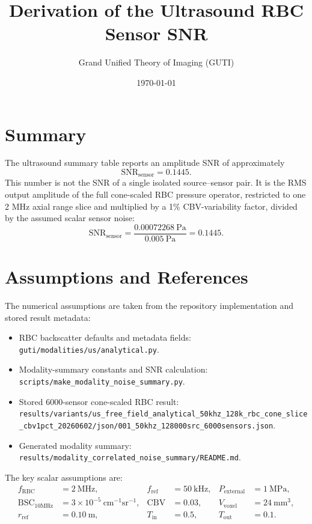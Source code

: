 \documentclass[11pt]{article}
\title{Derivation of the Ultrasound RBC Sensor SNR}
\author{Grand Unified Theory of Imaging (GUTI)}
\date{\today}
\begin{document}
\maketitle

\section*{Summary}

The ultrasound summary table reports an amplitude SNR of approximately
\[
  \mathrm{SNR}_{\mathrm{sensor}} = 0.1445.
\]
This number is not the SNR of a single isolated source--sensor pair.  It is the
RMS output amplitude of the full cone-scaled RBC pressure operator, restricted
to one 2 MHz axial range slice and multiplied by a 1\% CBV-variability factor,
divided by the assumed scalar sensor noise:
\[
  \mathrm{SNR}_{\mathrm{sensor}}
  =
  \frac{0.00072268~\mathrm{Pa}}{0.005~\mathrm{Pa}}
  =
  0.1445.
\]

\section*{Assumptions and References}

The numerical assumptions are taken from the repository implementation and
stored result metadata:
\begin{itemize}
  \item RBC backscatter defaults and metadata fields:
    \texttt{guti/modalities/us/analytical.py}.
  \item Modality-summary constants and SNR calculation:
    \texttt{scripts/make\_modality\_noise\_summary.py}.
  \item Stored 6000-sensor cone-scaled RBC result:
    \texttt{results/variants/us\_free\_field\_analytical\_50khz\_128k\_rbc\_cone\_slice\_cbv1pct\_20260602/json/001\_50khz\_128000src\_6000sensors.json}.
  \item Generated modality summary:
    \texttt{results/modality\_correlated\_noise\_summary/README.md}.
\end{itemize}

The key scalar assumptions are:
\[
\begin{aligned}
  f_{\mathrm{RBC}} &= 2~\mathrm{MHz},&
  f_{\mathrm{ref}} &= 50~\mathrm{kHz},&
  P_{\mathrm{external}} &= 1~\mathrm{MPa},\\
  \mathrm{BSC}_{10\mathrm{MHz}} &= 3\times 10^{-5}~\mathrm{cm}^{-1}\mathrm{sr}^{-1},&
  \mathrm{CBV} &= 0.03,&
  V_{\mathrm{voxel}} &= 24~\mathrm{mm}^{3},\\
  r_{\mathrm{ref}} &= 0.10~\mathrm{m},&
  T_{\mathrm{in}} &= 0.5,&
  T_{\mathrm{out}} &= 0.1.
\end{aligned}
\]
\end{document}
